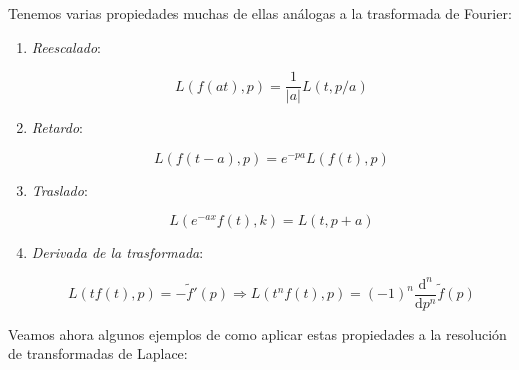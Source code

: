 \documentclass[12pt]{book}
\newcommand{\D}{\mathrm{d}}
\begin{document}
Tenemos varias propiedades muchas de ellas análogas a la trasformada de Fourier:

\begin{enumerate}

\item \textit{Reescalado}:

$$ L(f(at),p) = \dfrac{1}{|a|} L(t,p/a) $$

\item \textit{Retardo}:

$$ L(f(t-a),p) = e^{-pa} L(f(t),p) $$

\item \textit{Traslado}:

$$ L(e^{-ax} f(t),k) = L(t,p+a) $$

\item \textit{Derivada de la trasformada}:

$$ L(t f(t), p) = - \tilde{f}'(p) \Longrightarrow L(t^n f(t), p) = (-1)^n \dfrac{\D^n}{\D p^n} \tilde{f} (p) $$

\end{enumerate}

Veamos ahora algunos ejemplos de como aplicar estas propiedades a la resolución de transformadas de Laplace:
\end{document}
